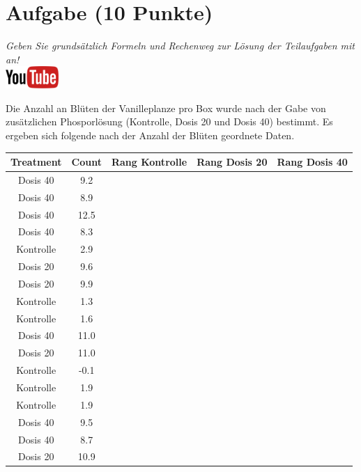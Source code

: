 \documentclass[a4paper, 10pt]{scrartcl}\usepackage[]{graphicx}\usepackage[]{xcolor}
\newenvironment{knitrout}{}{} %
\begin{document}
\section{Aufgabe \hfill (10 Punkte)}

\textit{Geben Sie grunds{\"a}tzlich Formeln und Rechenweg zur L{\"o}sung der
  Teilaufgaben mit an!} \\[1Ex]

\hfill\href{https://youtu.be/gC0SXiIG2wQ}{\includegraphics[width =
  2cm]{img/youtube}} %
\hspace{2Ex}




Die Anzahl an Bl{\"u}ten der Vanilleplanze pro Box wurde nach der Gabe von
zus{\"a}tzlichen Phosporl{\"o}sung (Kontrolle, Dosis 20 und Dosis 40) bestimmt. Es
ergeben sich folgende nach der Anzahl der Bl{\"u}ten geordnete Daten.

\begin{knitrout}
\color{fgcolor}\begin{table}[!h]
\centering
\begin{tabular}{ccccc}
\toprule
Treatment & Count & Rang Kontrolle & Rang Dosis 20 & Rang Dosis 40\\
\midrule
Dosis 40 & 9.2 &  &  & \\
Dosis 40 & 8.9 &  &  & \\
Dosis 40 & 12.5 &  &  & \\
Dosis 40 & 8.3 &  &  & \\
Kontrolle & 2.9 &  &  & \\
\addlinespace
Dosis 20 & 9.6 &  &  & \\
Dosis 20 & 9.9 &  &  & \\
Kontrolle & 1.3 &  &  & \\
Kontrolle & 1.6 &  &  & \\
Dosis 40 & 11.0 &  &  & \\
\addlinespace
Dosis 20 & 11.0 &  &  & \\
Kontrolle & -0.1 &  &  & \\
Kontrolle & 1.9 &  &  & \\
Kontrolle & 1.9 &  &  & \\
Dosis 40 & 9.5 &  &  & \\
\addlinespace
Dosis 40 & 8.7 &  &  & \\
Dosis 20 & 10.9 &  &  & \\
\bottomrule
\end{tabular}
\end{table}

\end{knitrout}
\end{document}
